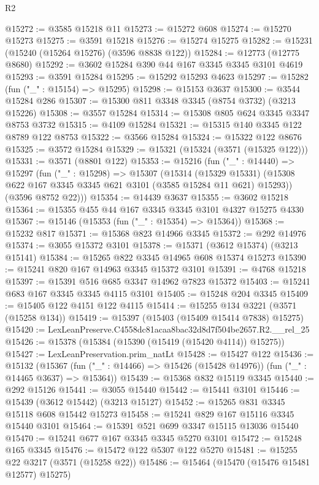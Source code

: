 \begin{lexlean}{R2}
\begin{coremodule}
@15272 := @3585 @15218 @11
@15273 := @15272 @608
@15274 := @15270 @15273
@15275 := @3591 @15218
@15276 := @15274 @15275
@15282 := @15231 (@15240 (@15264 @15276) (@3596 @8838 @122))
@15284 := @12773 (@12775 @8680)
@15292 := @3602 @15284 @390 @44 @167 @3345 @3345 @3101 @4619
@15293 := @3591 @15284
@15295 := @15292 @15293 @4623
@15297 := @15282 (fun ("_" : @15154) => @15295)
@15298 := @15153 @3637
@15300 := @3544 @15284 @286
@15307 := @15300 @811 @3348 @3345 (@8754 @3732) (@3213 @15226)
@15308 := @3557 @15284
@15314 := @15308 @805 @624 @3345 @3347 @8753 @3732
@15315 := @4109 @15284
@15321 := @15315 @140 @3345 @122 @8789 @122 @8753
@15322 := @3566 @15284
@15324 := @15322 @122 @8676
@15325 := @3572 @15284
@15329 := @15321 (@15324 (@3571 (@15325 @122)))
@15331 := @3571 (@8801 @122)
@15353 := @15216
    (fun ("_" : @14440) =>
    @15297
      (fun ("_" : @15298) =>
      @15307
        (@15314
          (@15329 @15331)
          (@15308 @622 @167 @3345 @3345 @621 @3101 (@3585 @15284 @11 @621) @15293))
        (@3596 @8752 @22)))
@15354 := @14439 @3637
@15355 := @3602 @15218
@15364 := @15355 @455 @44 @167 @3345 @3345 @3101 @4327 @15275 @4330
@15367 := @15146 (@15353 (fun ("_" : @15354) => @15364))
@15368 := @15232 @817
@15371 := @15368 @823 @14966 @3345
@15372 := @292 @14976
@15374 := @3055 @15372 @3101
@15378 := @15371 (@3612 @15374) (@3213 @15141)
@15384 := @15265 @822 @3345 @14965 @608 @15374 @15273
@15390 := @15241 @820 @167 @14963 @3345 @15372 @3101
@15391 := @4768 @15218
@15397 := @15391 @516 @685 @3347 @14962 @7823 @15372
@15403 := @15241 @683 @167 @3345 @3345 @4115 @3101
@15405 := @15248 @204 @3345
@15409 := @15405 @122 @4151 @122 @4115
@15414 := @15255 @134 @3221 (@3571 (@15258 @134))
@15419 := @15397 (@15403 (@15409 @15414 @7838) @15275)
@15420 := LexLeanPreserve.C4558dc81acaa8bac32d8d7f504be2657.R2.__rel_25
@15426 := @15378 (@15384 (@15390 (@15419 (@15420 @4114)) @15275))
@15427 := LexLeanPreservation.prim_natLt
@15428 := @15427 @122
@15436 := @15132
    (@15367 (fun ("_" : @14466) => @15426 (@15428 @14976)) (fun ("_" : @14465 @3637) => @15364))
@15439 := @15368 @832 @15119 @3345
@15440 := @292 @15126
@15441 := @3055 @15440
@15442 := @15441 @3101
@15446 := @15439 (@3612 @15442) (@3213 @15127)
@15452 := @15265 @831 @3345 @15118 @608 @15442 @15273
@15458 := @15241 @829 @167 @15116 @3345 @15440 @3101
@15464 := @15391 @521 @699 @3347 @15115 @13036 @15440
@15470 := @15241 @677 @167 @3345 @3345 @5270 @3101
@15472 := @15248 @165 @3345
@15476 := @15472 @122 @5307 @122 @5270
@15481 := @15255 @22 @3217 (@3571 (@15258 @22))
@15486 := @15464 (@15470 (@15476 @15481 @12577) @15275)

\end{coremodule}
\end{lexlean}
